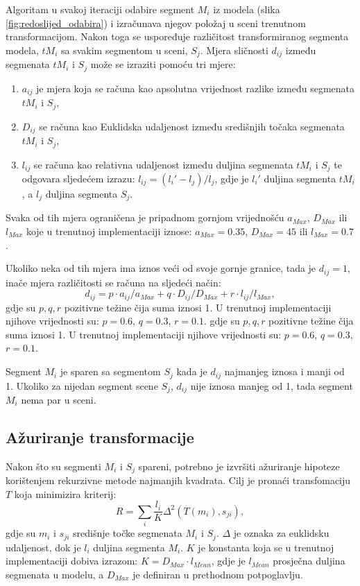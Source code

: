 \documentclass[lmodern, utf8, seminar, numeric]{fer}
\begin{document}
Algoritam u svakoj iteraciji odabire segment $M_i$ iz modela (slika \ref{fig:redoslijed_odabira}) i izračunava njegov položaj u sceni trenutnom transformacijom. Nakon toga se uspoređuje različitost transformiranog segmenta modela, $tM_i$ sa svakim segmentom u sceni, $S_j$. Mjera sličnosti $d_{ij}$ između segmenata $tM_i$ i $S_j$ može se izraziti pomoću tri mjere:
\begin{enumerate}
  \item $a_{ij}$ je mjera koja se računa kao apsolutna vrijednost razlike između segmenata $tM_i$ i $S_j$,
  \item $D_{ij}$
se računa kao Euklidska udaljenost između središnjih točaka segmenata $tM_i$ i $S_j$,
  \item $l_{ij}$ se računa kao relativna udaljenost između duljina segmenata $tM_i$ i $S_j$ te odgovara sljedećem izrazu: $l_{ij}=(l_i'-l_j)/l_j$, gdje je $l_i'$ duljina segmenta $tM_i$, a $l_j$ duljina segmenta $S_j$.
\end{enumerate}

Svaka od tih mjera ograničena je pripadnom gornjom vrijednošću $a_{Max}$, $D_{Max}$ ili $l_{Max}$ koje u trenutnoj implementaciji iznose: $a_{Max}=0.35$, $D_{Max}=45$ ili $l_{Max}=0.7$.

Ukoliko neka od tih mjera ima iznos veći od svoje gornje granice, tada je $d_{ij}=1$, inače mjera različitosti se računa na sljedeći način:
\begin{equation}
d_{ij}=p\cdot a_{ij}/a_{Max}+q\cdot D_{ij}/D_{Max}+r\cdot l_{ij}/l_{Max},
\end{equation}
gdje su $p,q,r$ pozitivne težine čija suma iznosi 1. U trenutnoj implementaciji njihove vrijednosti su: $p=0.6$, $q =0.3$, $r=0.1$.
gdje su $p,q,r$ pozitivne težine čija suma iznosi 1. U trenutnoj implementaciji njihove vrijednosti su: $p=0.6$, $q =0.3$, $r=0.1$.

Segment $M_i$ je sparen sa segmentom $S_j$ kada je $d_{ij}$ najmanjeg iznosa i manji od 1. Ukoliko za nijedan segment scene $S_j$, $d_{ij}$ nije iznosa manjeg od 1, tada segment $M_i$ nema par u sceni.

\subsection{Ažuriranje transformacije}
Nakon što su segmenti $M_i$ i $S_j$ spareni, potrebno je izvršiti ažuriranje hipoteze korištenjem rekurzivne metode najmanjih kvadrata. Cilj je pronaći transfomaciju $T$ koja minimizira kriterij:
$$R=\sum_i \frac{l_i}{K}\Delta^2(T(m_i),s_{ji}),$$
gdje su $m_i$ i $s_{ji}$ središnje točke segmenata $M_i$ i $S_j$. $\Delta$ 
je oznaka za euklidsku udaljenost, dok je $l_i$ duljina segmenta $M_i$. $K$ je konstanta koja se u trenutnoj implementaciji dobiva izrazom:
$K = D_{Max}\cdot l_{Mean}$, gdje je $l_{Mean}$ prosječna duljina segmenata u modelu, a $D_{Max}$ je definiran u prethodnom potpoglavlju.
\end{document}
